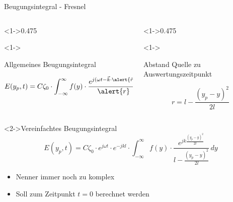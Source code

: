 \begin{frame}{Beugungsintegral - Fresnel}
    \begin{columns}
        \begin{column}[t, onlytextwidth]<1->{0.475\textwidth}
            \begin{block}<1->{\strut Allgemeines Beugungsintegral}
                \begin{equation*}
                    E(y_p, t)
                    =
                    C\zeta_0 \cdot \int_{-\infty}^{\infty}f(y)\cdot\frac{e^{j(\omega t - \vec{k}\cdot\alert{\vec{r}})}}{\alert{r}} \,dy
                \end{equation*}
            \end{block}
        \end{column}
        \begin{column}[t, onlytextwidth]<1->{0.475\textwidth}
            \begin{block}<1->{\strut Abstand Quelle zu Auswertungszeitpunkt}
                \begin{equation*}
                    r
                    =
                    l - \frac{(y_p-y)^2}{2l}
                \end{equation*}
            \end{block}
        \end{column}
    \end{columns}

    \begin{block}<2->{Vereinfachtes Beugungsintegral}
        \begin{equation*}
            E(y_p, t)
            =
            C\zeta_0 \cdot e^{j\omega t} \cdot e^{-jkl} \cdot \int_{-\infty}^{\infty}f(y)\cdot\frac{e^{jk\frac{(y_p-y)^2}{2l}}}{l - \frac{(y_p-y)^2}{2l}} \,dy
        \end{equation*}
        \begin{itemize}
            \item<3-> Nenner immer noch zu komplex
            \item<4-> Soll zum Zeitpunkt $t=0$ berechnet werden
        \end{itemize}

    \end{block}
\end{frame}

